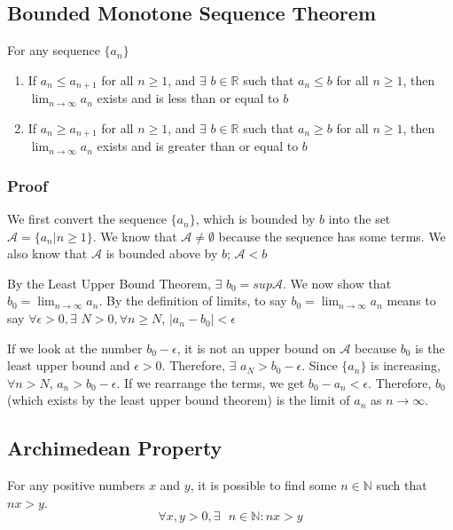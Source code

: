 \documentclass[11 pt, twoside]{article}
\begin{document}
\subsection{Bounded Monotone Sequence Theorem}

For any sequence $\{a_n\}$
\begin{enumerate}
    \item If $a_n \leq a_{n+1}$ for all $n \geq 1$, and $\exists$ $b \in
        \mathbb{R}$ such that $a_n \leq b$ for all $n \geq 1$,  then
        $\lim_{n\to\infty} a_n$ exists and is less than or equal to $b$
    \item If $a_n \geq a_{n+1}$ for all $n \geq 1$, and $\exists$ $b \in
        \mathbb{R}$ such that $a_n \geq b$ for all $n \geq 1$, then
        $\lim_{n\to\infty} a_n$ exists and is greater than or equal to $b$
\end{enumerate}

\subsubsection{Proof}

We first convert the sequence $\{a_n\}$, which is bounded by $b$ into the
set $\mathcal{A} = \{a_n | n \geq 1\}$. We know that $\mathcal{A} \neq
\emptyset$ because the sequence has some terms. We also know that $\mathcal{A}$
is bounded above by $b$; $\mathcal{A} < b$

By the Least Upper Bound Theorem, $\exists$ $b_0 = sup \mathcal{A}$. We now show
that $b_0 = \lim_{n\to\infty}a_n$. By the definition of limits, to say $b_0 =
\lim_{n\to\infty} a_n$ means to say $\forall \epsilon > 0, \exists$ $N > 0,
\forall n \geq N$, $|a_n - b_0| < \epsilon$

If we look at the number $b_0 - \epsilon$, it is not an upper bound on
$\mathcal{A}$ because $b_0$ is the least upper bound and $\epsilon > 0$.
Therefore, $\exists$ $a_N > b_0 - \epsilon$. Since $\{a_n\}$ is increasing,
$\forall n > N$, $a_n > b_0 - \epsilon$. If we rearrange the terms, we get $b_0
- a_n < \epsilon$. Therefore, $b_0$ (which exists by the least upper bound
theorem) is the limit of $a_n$ as $n \to \infty$.

\subsection{Archimedean Property}

For any positive numbers $x$ and $y$, it is possible to find some $n \in
\mathbb{N}$ such that $nx > y$.
$$\forall x, y > 0, \exists\text{ } n \in \mathbb{N}: nx > y$$
\end{document}
